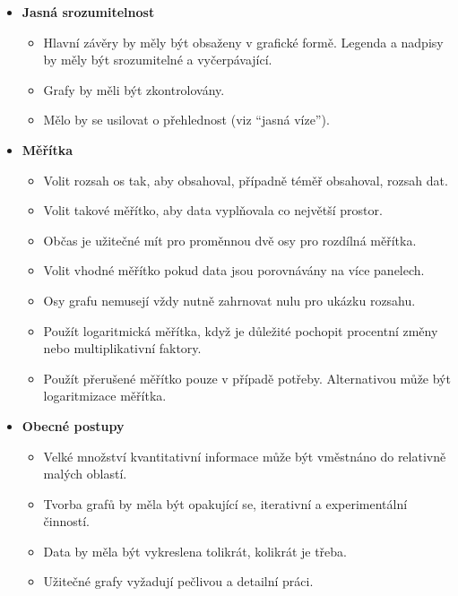 \documentclass[12pt,]{article}
\providecommand{\tightlist}{%
  \setlength{\itemsep}{0pt}\setlength{\parskip}{0pt}}
\begin{document}
\begin{itemize}
\tightlist
\item
  \textbf{Jasná srozumitelnost}

  \begin{itemize}
  \tightlist
  \item
    Hlavní závěry by měly být obsaženy v grafické formě. Legenda a
    nadpisy by měly být srozumitelné a vyčerpávající.
  \item
    Grafy by měli být zkontrolovány.
  \item
    Mělo by se usilovat o přehlednost (viz \enquote{jasná víze}).
  \end{itemize}
\end{itemize}

\newpage

\begin{itemize}
\tightlist
\item
  \textbf{Měřítka}

  \begin{itemize}
  \tightlist
  \item
    Volit rozsah os tak, aby obsahoval, případně téměř obsahoval, rozsah
    dat.
  \item
    Volit takové měřítko, aby data vyplňovala co největší prostor.
  \item
    Občas je užitečné mít pro proměnnou dvě osy pro rozdílná měřítka.
  \item
    Volit vhodné měřítko pokud data jsou porovnávány na více panelech.
  \item
    Osy grafu nemusejí vždy nutně zahrnovat nulu pro ukázku rozsahu.
  \item
    Použít logaritmická měřítka, když je důležité pochopit procentní
    změny nebo multiplikativní faktory.
  \item
    Použít přerušené měřítko pouze v případě potřeby. Alternativou může
    být logaritmizace měřítka.
  \end{itemize}
\item
  \textbf{Obecné postupy}

  \begin{itemize}
  \tightlist
  \item
    Velké množství kvantitativní informace může být vměstnáno do
    relativně malých oblastí.
  \item
    Tvorba grafů by měla být opakující se, iterativní a experimentální
    činností.
  \item
    Data by měla být vykreslena tolikrát, kolikrát je třeba.
  \item
    Užitečné grafy vyžadují pečlivou a detailní práci.
  \end{itemize}
\end{itemize}
\end{document}
